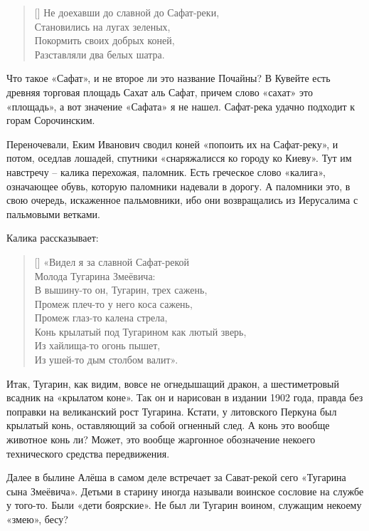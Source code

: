 \settowidth{\versewidth}{Не доехавши до славной до Сафат-реки,} 
\begin{verse}[\versewidth]
Не доехавши до славной до Сафат-реки,\\
Становились на лугах зеленых,\\
Покормить своих добрых коней,\\
Разставляли два белых шатра.\\
\end{verse}

Что такое «Сафат», и не второе ли это название Почайны? В Кувейте есть древняя торговая площадь Сахат аль Сафат, причем слово «сахат» это «площадь», а вот значение «Сафата» я не нашел. Сафат-река удачно подходит к горам Сорочинским.

Переночевали, Еким Иванович сводил коней «попоить их на Сафат-реку», и потом, оседлав лошадей, спутники «снаряжалисся ко городу ко Киеву». Тут им навстречу – калика перехожая, паломник. Есть греческое слово «калига», означающее обувь, которую паломники надевали в дорогу. А паломники это, в свою очередь, искаженное пальмовники, ибо они возвращались из Иерусалима с пальмовыми ветками. 

Калика рассказывает:

\settowidth{\versewidth}{Конь крылатый под Тугарином как лютый зверь,} 
\begin{verse}[\versewidth]
«Видел я за славной Сафат-рекой\\
Молода Тугарина Змеёвича:\\
В вышину-то он, Тугарин, трех сажень,\\ 
Промеж плеч-то у него коса сажень,\\
Промеж глаз-то калена стрела,\\
Конь крылатый под Тугарином как лютый зверь,\\
Из хайлища-то огонь пышет,\\
Из ушей-то дым столбом валит».\\
\end{verse}

Итак, Тугарин, как видим, вовсе не огнедышащий дракон, а шестиметровый всадник на «крылатом коне». Так он и нарисован в издании 1902 года, правда без поправки на великанский рост Тугарина. Кстати, у литовского Перкуна был крылатый конь, оставляющий за собой огненный след. А конь это вообще животное конь ли? Может, это вообще жаргонное обозначение некоего технического средства передвижения.

Далее в былине Алёша в самом деле встречает за Сават-рекой сего «Тугарина сына Змеёвича». Детьми в старину иногда называли воинское сословие на службе у того-то. Были «дети боярские». Не был ли Тугарин воином, служащим некоему «змею», бесу?

